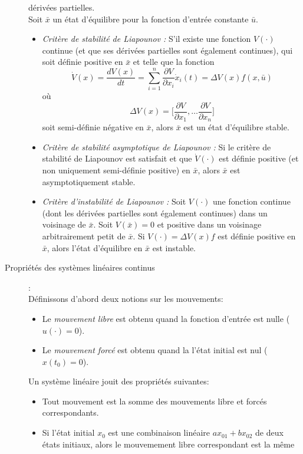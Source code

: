 \documentclass[a4paper]{article}
\begin{document}
\begin{description}
		dérivées partielles.\\
		Soit $\bar x$ un état d'équilibre pour la fonction d'entrée constante $\bar u$.
		\begin{itemize}
			\item \emph{Critère de stabilité de Liapounov :} S'il existe une fonction
				$V(\cdot)$ continue (et que ses dérivées partielles sont également continues),
				qui soit définie positive en $\bar x$ et telle que la fonction
				\[\dot V(x)=\frac{dV(x)}{dt}
					=\sum_{i=1}^{n}\frac{\partial V}{\partial x_i}\dot x_i(t)
					=\Delta V(x)f(x,\bar u)\]
				où
				\[\Delta V(x)=\big[\frac{\partial V}{\partial x_1},\dots\frac{\partial V}{\partial x_n}\big]\]
				soit semi-définie négative en $\bar x$, alors $\bar x$ est un état d'équilibre stable.
			\item \emph{Critère de stabilité asymptotique de Liapounov :}
				Si le critère de stabilité de Liapounov est satisfait et que $\dot V(\cdot)$
				est définie positive (et non uniquement semi-définie positive) en $\bar x$,
				alors $\bar x$ est asymptotiquement stable.
			\item \emph{Critère d'instabilité de Liapounov :} Soit $V(\cdot)$
				une fonction continue (dont les dérivées partielles sont également continues)
				dans un voisinage de $\bar x$.
				Soit $V(\bar x)=0$ et positive dans un voisinage arbitrairement petit de $\bar x$.
				Si $V(\cdot)=\Delta V(x)f$ est définie positive en $\bar x$,
				alors l'état d'équilibre en $\bar x$ est instable.
		\end{itemize}
	\item [Propriétés des systèmes linéaires continus]:\\
		Définissons d'abord deux notions sur les mouvements:
		\begin{itemize}
			\item Le \emph{mouvement libre} est obtenu quand la fonction d'entrée est nulle ($u(\cdot)=0$).
			\item Le \emph{mouvement forcé} est obtenu quand la l'état initial est nul ($x(t_0)=0$).
		\end{itemize}
		Un système linéaire jouit des propriétés suivantes:
		\begin{itemize}
			\item Tout mouvement est la somme des mouvements libre et forcés correspondants.
			\item Si l'état initial $x_0$ est une combinaison linéaire $ax_{01} + bx_{02}$ de
				deux états initiaux, alors le mouvemement libre correspondant est la même

\end{itemize}
\end{description}
\end{document}
